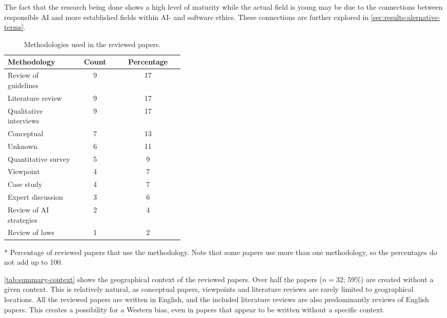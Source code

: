 The fact that the research being done shows a high level of maturity while the actual field is young may be due to the connections between responsible AI and more established fields within AI- and software ethics. These connections are further explored in \autoref{sec:results-alernative-terms}.

\begin{table}[ht]
    \centering
    \caption{Methodologies used in the reviewed papers.}
    \label{tab:summary-methodology}
    \begin{threeparttable}
    \begin{tabular}{p{0.4\linewidth}cc}
    \toprule
        \textbf{Methodology} & \textbf{Count} & \textbf{Percentage}\tnote{*} \\
    \midrule
        Review of guidelines    & 9     & 17  \\
        Literature review       & 9     & 17  \\
        Qualitative interviews  & 9     & 17  \\
        Conceptual              & 7     & 13  \\
        Unknown                 & 6     & 11  \\
        Quantitative survey     & 5     & 9   \\
        Viewpoint               & 4     & 7   \\
        Case study              & 4     & 7   \\
        Expert discussion       & 3     & 6   \\
        Review of AI strategies & 2     & 4   \\
        Review of laws          & 1     & 2   \\
    \bottomrule
    \end{tabular}
    \begin{tablenotes}
        \footnotesize
        \item [*] Percentage of reviewed papers that use the methodology. Note that some papers use more than one methodology, so the percentages do not add up to 100.
    \end{tablenotes}
\end{threeparttable}
\end{table}

\autoref{tab:summary-context} shows the geographical context of the reviewed papers. Over half the papers ($n = 32$; 59\%) are created without a given context. This is relatively natural, as conceptual papers, viewpoints and literature reviews are rarely limited to geographical locations. All the reviewed papers are written in English, and the included literature reviews are also predominantly reviews of English papers. This creates a possibility for a Western bias, even in papers that appear to be written without a specific context.

